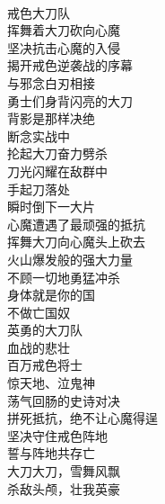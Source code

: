\begin{poem}[戒色喜峰口]
    \begin{multicols}{2}
        \centering~\\
        戒色大刀队 \\ 挥舞着大刀砍向心魔 \\ 坚决抗击心魔的入侵 \\ 揭开戒色逆袭战的序幕 \\ 与邪念白刃相接 \\ 勇士们身背闪亮的大刀 \\ 背影是那样决绝 \\ 断念实战中 \\ 抡起大刀奋力劈杀 \\ 刀光闪耀在敌群中 \\ 手起刀落处 \\ 瞬时倒下一大片 \\ 心魔遭遇了最顽强的抵抗 \\ 挥舞大刀向心魔头上砍去 \\ 火山爆发般的强大力量 \\ 不顾一切地勇猛冲杀 \\ 身体就是你的国 \\ 不做亡国奴 \\ 英勇的大刀队 \\ 血战的悲壮 \\ 百万戒色将士 \\ 惊天地、泣鬼神 \\ 荡气回肠的史诗对决 \\ 拼死抵抗，绝不让心魔得逞 \\ 坚决守住戒色阵地 \\ 誓与阵地共存亡 \\ 大刀大刀，雪舞风飘 \\ 杀敌头颅，壮我英豪
    \end{multicols}
\end{poem}

